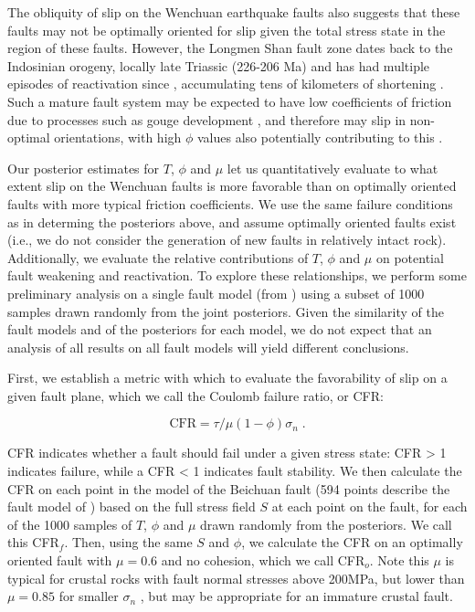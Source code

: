 \documentclass[twocolumn,jgrga]{AGUTeX}
\begin{document}
\begin{article}
{The obliquity of slip on the Wenchuan earthquake faults also suggests
that these faults may not be optimally oriented for slip given the total
stress state in the region of these faults. However, the Longmen Shan
fault zone dates back to the Indosinian orogeny, locally late Triassic
(226-206 Ma) \citep{yong2003} and has had multiple episodes of
reactivation since \citep[e.g.,][]{burchfiel1995, wang2012}, accumulating
tens of kilometers of shortening \citep[e.g.,][]{hubbard2010}. Such a mature
fault system may be expected to have low coefficients of friction due to
processes such as gouge development \citep[e.g.,][]{kuo2014}, and therefore
may slip in non-optimal orientations, with high $\phi$ values also
potentially contributing to this \citep[e.g.,][]{sibson1985}.

Our posterior estimates for $T$, $\phi$ and $\mu$ let us quantitatively
evaluate to what extent slip on the Wenchuan faults is more favorable
than on optimally oriented faults with more typical friction
coefficients. We use the same failure conditions as in determing the
posteriors above, and assume optimally oriented faults exist
(i.e., we do not consider the generation of new faults in relatively 
intact rock).
Additionally, we evaluate the relative contributions of $T$, $\phi$ and
$\mu$ on potential fault weakening and reactivation. To explore these
relationships, we perform some preliminary analysis on a single fault
model (from \citet{zhang2011}) using a subset of 1000
samples drawn randomly from the joint posteriors. Given the similarity
of the fault models and of the posteriors for each model, we do not
expect that an analysis of all results on all fault models will yield
different conclusions.

First, we establish a metric with which to evaluate the favorability of
slip on a given fault plane, which we call the Coulomb failure ratio, or
CFR:

\begin{equation}
\mathrm{CFR} = \tau / \mu (1 - \phi) \sigma_n \; .
\label{eqn:cfr}
\end{equation}

CFR indicates whether a fault should fail under a given stress state:
CFR \textgreater{} 1 indicates failure, while a CFR \textless{} 1
indicates fault stability. We then calculate the CFR on each point in
the model of the Beichuan fault (594 points describe the fault model of
\citet{zhang2011}) based on the full stress field $S$ at
each point on the fault, for each of the 1000 samples of $T$, $\phi$ and
$\mu$ drawn randomly from the posteriors. We call this CFR$_f$. Then,
using the same $S$ and $\phi$, we calculate the CFR on an optimally
oriented fault with $\mu=0.6$ and no cohesion, which we call CFR$_o$.
Note this $\mu$ is typical for crustal rocks with fault normal stresses
above 200MPa, but lower than $\mu = 0.85$ for smaller $\sigma_n$
\citep{byerlee1978}, but may be appropriate for an immature crustal
fault.

}
\end{article}
\end{document}
